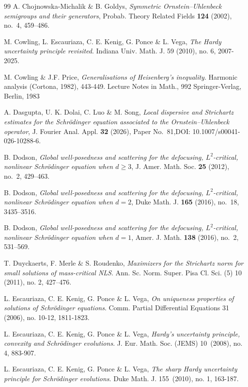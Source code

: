 \documentclass[11pt,a4paper]{amsart}
\numberwithin{equation}{section}
\numberwithin{equation}{section}
\begin{document}
\begin{thebibliography}{99}
A. Chojnowska-Michalik \& B. Goldys,
\emph{Symmetric Ornstein--Uhlenbeck semigroups and their generators},
Probab. Theory Related Fields \textbf{124} (2002), no.~4, 459--486.

M. Cowling, L. Escauriaza, C. E. Kenig, G. Ponce \& L. Vega, \emph{The Hardy uncertainty principle revisited}.
Indiana Univ. Math. J. 59 (2010), no. 6, 2007-2025.

M. Cowling \& J.F. Price, \emph{Generalisations of Heisenberg's inequality}. Harmonic analysis (Cortona, 1982), 443-449.
Lecture Notes in Math., 992
Springer-Verlag, Berlin, 1983

A. Dasgupta, U. K. Dolai, C. Luo \& M. Song,
\emph{Local dispersive and Strichartz estimates for the Schr\"odinger equation associated to the Ornstein--Uhlenbeck operator},
J. Fourier Anal. Appl. \textbf{32} (2026), Paper No.~81,\newline DOI: 10.1007/s00041-026-10288-6.

B. Dodson, \emph{Global well-posedness and scattering for the defocusing, $L^2$-critical, nonlinear Schr\"odinger equation when $d\geq3$}, J. Amer. Math. Soc. \textbf{25} (2012), no.~2, 429--463.

B. Dodson, \emph{Global well-posedness and scattering for the defocusing, $L^2$-critical, nonlinear Schr\"odinger equation when $d=2$}, Duke Math. J. \textbf{165} (2016), no.~18, 3435--3516.

B. Dodson, \emph{Global well-posedness and scattering for the defocusing, $L^2$-critical, nonlinear Schr\"odinger equation when $d=1$}, Amer. J. Math. \textbf{138} (2016), no.~2, 531--569.

T. Duyckaerts, F. Merle \& S. Roudenko, \emph{Maximizers for the Strichartz norm for small solutions of mass-critical NLS}.
Ann. Sc. Norm. Super. Pisa Cl. Sci. (5) 10 (2011), no. 2, 427--476.

L. Escauriaza, C. E. Kenig, G. Ponce \& L. Vega, \emph{On uniqueness properties of solutions of Schr\"odinger equations}.
Comm. Partial Differential Equations 31 (2006), no. 10-12, 1811-1823.

L. Escauriaza, C. E. Kenig, G. Ponce \& L. Vega, \emph{Hardy's uncertainty principle, convexity and Schr\"odinger evolutions}.
J. Eur. Math. Soc. (JEMS) 10~(2008), no. 4, 883-907.

L. Escauriaza, C. E. Kenig, G. Ponce \& L. Vega, \emph{The sharp Hardy uncertainty principle for Schr\"odinger evolutions}.
Duke Math. J. 155~(2010), no. 1, 163-187.


\end{thebibliography}
\end{document}
